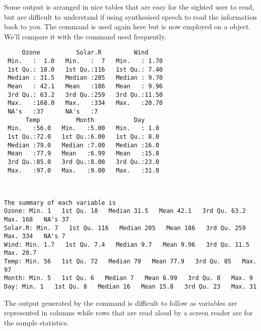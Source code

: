 Some \R{} output is arranged in nice tables that are easy for the sighted user to read, but are difficult to understand if using synthesised  speech to read the information back to you. The  command is used again here but is now employed on a  object. We'll compare it with the  command used frequently. 
\begin{knitrout}
\color{fgcolor}\begin{kframe}
\begin{alltt}
\hlstd{> }
\end{alltt}
\begin{verbatim}
     Ozone          Solar.R         Wind      
 Min.   :  1.0   Min.   :  7   Min.   : 1.70  
 1st Qu.: 18.0   1st Qu.:116   1st Qu.: 7.40  
 Median : 31.5   Median :205   Median : 9.70  
 Mean   : 42.1   Mean   :186   Mean   : 9.96  
 3rd Qu.: 63.2   3rd Qu.:259   3rd Qu.:11.50  
 Max.   :168.0   Max.   :334   Max.   :20.70  
 NA's   :37      NA's   :7                    
      Temp          Month           Day      
 Min.   :56.0   Min.   :5.00   Min.   : 1.0  
 1st Qu.:72.0   1st Qu.:6.00   1st Qu.: 8.0  
 Median :79.0   Median :7.00   Median :16.0  
 Mean   :77.9   Mean   :6.99   Mean   :15.8  
 3rd Qu.:85.0   3rd Qu.:8.00   3rd Qu.:23.0  
 Max.   :97.0   Max.   :9.00   Max.   :31.0  
                                             
\end{verbatim}
\begin{alltt}
\hlstd{> }
\end{alltt}
\begin{verbatim}

The summary of each variable is
Ozone: Min. 1   1st Qu. 18   Median 31.5   Mean 42.1   3rd Qu. 63.2   Max. 168   NA's 37  
Solar.R: Min. 7   1st Qu. 116   Median 205   Mean 186   3rd Qu. 259   Max. 334   NA's 7  
Wind: Min. 1.7   1st Qu. 7.4   Median 9.7   Mean 9.96   3rd Qu. 11.5   Max. 20.7  
Temp: Min. 56   1st Qu. 72   Median 79   Mean 77.9   3rd Qu. 85   Max. 97  
Month: Min. 5   1st Qu. 6   Median 7   Mean 6.99   3rd Qu. 8   Max. 9  
Day: Min. 1   1st Qu. 8   Median 16   Mean 15.8   3rd Qu. 23   Max. 31  
\end{verbatim}
\end{kframe}
\end{knitrout}
 
The output generated by the  command is difficult to follow as variables are represented in columns while rows that are read aloud by a screen reader are for the sample statistics. 
 
